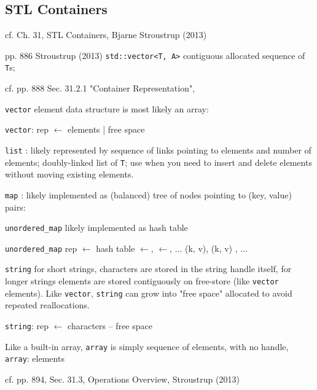 \documentclass[10pt]{amsart}
\begin{document}
\begin{multicols*}{2}
\subsection{STL Containers}

cf. Ch. 31, STL Containers, Bjarne Stroustrup (2013) \cite{Stro2013}

pp. 886 Stroustrup (2013) \cite{Stro2013}
\verb|std::vector<T, A>| contiguous allocated sequence of \verb|T|s;

cf. pp. 888 Sec. 31.2.1 "Container Representation", \cite{Stro2013}

\verb|vector| element data structure is most likely an array:

\verb|vector|: rep $\leftarrow$ elements | free space

\verb|list| : likely represented by sequence of links pointing to elements and number of elements; doubly-linked list of \verb|T|; use when you need to insert and delete elements without moving existing elements.

\verb|map| : likely implemented as (balanced) tree of nodes pointing to (key, value) pairs:

\verb|unordered_map| likely implemented as hash table

\verb|unordered_map| rep $\leftarrow $ hash table $\leftarrow$, $\leftarrow$, $\dots$ (k, v), (k, v) , $\dots$

\verb|string| for short strings, characters are stored in the string handle itself, for longer strings elements are stored contiguously on free-store (like \verb|vector| elements). Like \verb|vector|, \verb|string| can grow into "free space" allocated to avoid repeated reallocations.

\verb|string|: rep $\leftarrow$ characters -- free space

Like a built-in array, \verb|array| is simply sequence of elements, with no handle,
\verb|array|: elements

cf. pp. 894, Sec. 31.3, Operations Overview, Stroustrup (2013) \cite{Stro2013}


\end{multicols*}
\end{document}
